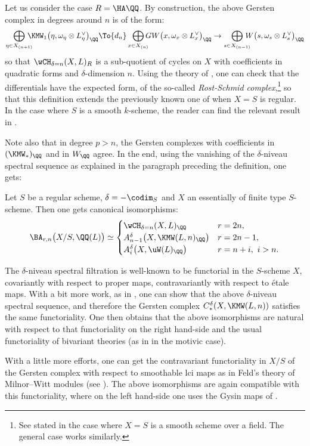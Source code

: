 \begin{num}\label{num:RostSchmid}
Let us consider the case $R=\HA \QQ$.
By construction, the above Gersten complex in degrees around $n$ is of the form:
\[
\bigoplus_{\eta \in X_{(n+1)}}\hspace*{-3mm} \KMW_1\big(\eta,\omega_\eta \otimes L_\eta^\vee\big)_\QQ
\To{d_n} \bigoplus_{x \in X_{(n)}}\hspace*{-2mm} GW\big(x,\omega_x \otimes L_x^\vee\big)_\QQ
\to \bigoplus_{s \in X_{(n-1)}}\hspace*{-3mm} W\big(s,\omega_s \otimes L_s^\vee\big)_\QQ
\]
so that $\wCH_{\delta=n}(X,L)_R$ is a sub-quotient of cycles on $X$ with coefficients
in quadratic forms and $\delta$-dimension $n$.
Using the theory of \cite{Feld2},
one can check that the \hbox{differentials} have the expected form,
of the so-called \emph{Rost-Schmid complex},\footnote{See \cite[\S 3.3]{Feld2}
stated in the case where $X=S$ is a smooth scheme over a field.
The general case works similarly.}
so that this definition extends the previously known one of \cite{Fasel_wCH} when $X=S$
is regular. In the case where $S$ is a smooth $k$-scheme, the reader can find the relevant
result in \cite[Chap.\,6, Lem.\,4.2.3]{BCDFO}.

Note also that in degree $p>n$, the Gersten complexes with coefficients in
$(\KMW_*)_\QQ$ and in $W_\QQ$ agree. In the end, using the vanishing
of the $\delta$-niveau spectral sequence as explained in the paragraph preceding the definition, one gets:
\end{num}
\begin{thm}\label{thm:biv_A1&ChowWitt}
Let $S$ be a regular scheme, $\delta=-\codim_S$ and $X$ an essentially of finite type $S$-scheme.
Then one gets canonical isomorphisms:
\[
\BA_{r,n}\big(X/S,\QQ(L)\big) \simeq
\begin{cases}
\wCH_{\delta=n}(X,L)_\QQ & r=2n, \\
A^\delta_{n-1}\big(X,\KMW(L,n)_\QQ\big) & r=2n-1, \\
A^\delta_i\big(X,\uW(L)_\QQ\big) & r=n+i,\ i>n.
\end{cases}
\]
\end{thm}

\begin{rem}\label{rem:Gersten_functoriality}
The $\delta$-niveau spectral filtration
is well-known to be functorial in the $S$-scheme $X$,
covariantly with respect to proper maps,
contravariantly with respect to étale maps.
With a bit more work, as in \cite{Jin},
one can show that the above $\delta$-niveau spectral sequence, and therefore
the Gersten complex $C_*^\delta(X,\KMW(L,n))$ satisfies the same functoriality.
One then obtains that the above isomorphisms are natural with respect to
that functoriality on the right hand-side and the usual functoriality of
bivariant theories (as in \cite{DJK} in the motivic case).

With a little more efforts, one can get the contravariant functoriality
in $X/S$ of the Gersten complex with respect to smoothable lci maps
as in Feld's theory of Milnor--Witt modules (see \cite{Feld1}).
The above isomorphisms are again compatible with this functoriality,
where on the left hand-side one uses the Gysin maps of \cite{DJK}.
\end{rem}

